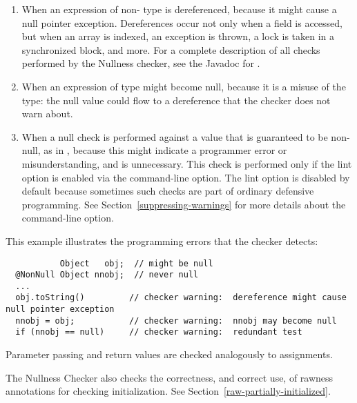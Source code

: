 \begin{enumerate}

\item
  When an expression of non- type
  is dereferenced, because it might cause a null pointer exception.
  Dereferences occur not only when a field is accessed, but when an array
  is indexed, an exception is thrown, a lock is taken in a synchronized
  block, and more.  For a complete description of all checks performed by
  the Nullness checker, see the Javadoc for
  .

\item
  When an expression of  type
  might become null, because it
  is a misuse of the type:  the null value could flow to a dereference that
  the checker does not warn about.

\item
  \label{lint-nulltest}
  When a null check is performed against a value that is guaranteed to be
  non-null, as in , because this might indicate a
  programmer error or misunderstanding, and is unnecessary.  This check is
  performed only if the  lint option is enabled via the
   command-line option.  The lint option is disabled
  by default because sometimes such checks are part of ordinary defensive
  programming.  See Section~\ref{suppressing-warnings} for more details
  about the  command-line option.

\end{enumerate}

This example illustrates the programming errors that the checker detects:

\begin{Verbatim}
           Object   obj;  // might be null
  @NonNull Object nnobj;  // never null
  ...
  obj.toString()         // checker warning:  dereference might cause null pointer exception
  nnobj = obj;           // checker warning:  nnobj may become null
  if (nnobj == null)     // checker warning:  redundant test
\end{Verbatim}

Parameter passing and return values are checked analogously to assignments.

The Nullness Checker also checks the correctness, and correct use, of
rawness annotations for checking initialization.  See
Section~\ref{raw-partially-initialized}.


